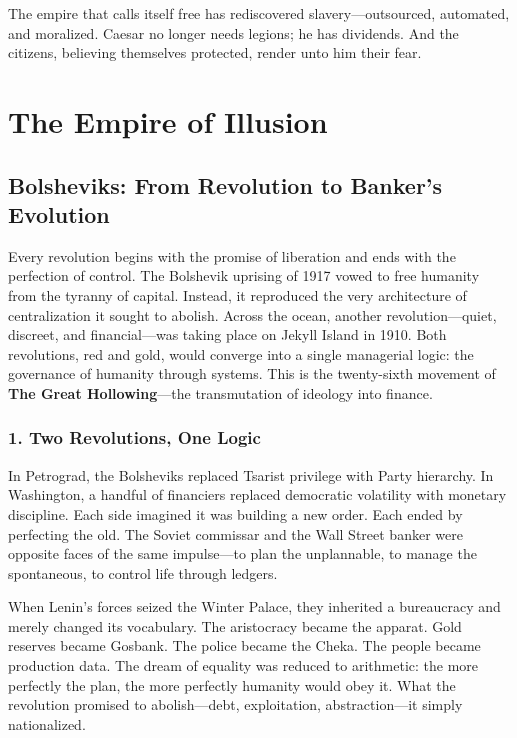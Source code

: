 \documentclass[11pt,twoside]{book}
\begin{document}
The empire that calls itself free has rediscovered slavery—outsourced, automated, and moralized.  Caesar no longer needs legions; he has dividends.  
And the citizens, believing themselves protected, render unto him their fear.

\part{The Empire of Illusion}

% 

% 
\chapter{Bolsheviks: From Revolution to Banker’s Evolution}
\label{ch:26.1}

Every revolution begins with the promise of liberation and ends with the perfection of control.  
The Bolshevik uprising of 1917 vowed to free humanity from the tyranny of capital.  
Instead, it reproduced the very architecture of centralization it sought to abolish.  
Across the ocean, another revolution—quiet, discreet, and financial—was taking place on Jekyll Island in 1910.  
Both revolutions, red and gold, would converge into a single managerial logic: the governance of humanity through systems.  
This is the twenty-sixth movement of \textbf{The Great Hollowing}—the transmutation of ideology into finance.

\section*{1. Two Revolutions, One Logic}

In Petrograd, the Bolsheviks replaced Tsarist privilege with Party hierarchy.  
In Washington, a handful of financiers replaced democratic volatility with monetary discipline.  
Each side imagined it was building a new order.  
Each ended by perfecting the old.  
The Soviet commissar and the Wall Street banker were opposite faces of the same impulse—to plan the unplannable, to manage the spontaneous, to control life through ledgers.

When Lenin’s forces seized the Winter Palace, they inherited a bureaucracy and merely changed its vocabulary.  
The aristocracy became the apparat.  
Gold reserves became Gosbank.  
The police became the Cheka.  
The people became production data.  
The dream of equality was reduced to arithmetic: the more perfectly the plan, the more perfectly humanity would obey it.  
What the revolution promised to abolish—debt, exploitation, abstraction—it simply nationalized.
\end{document}
